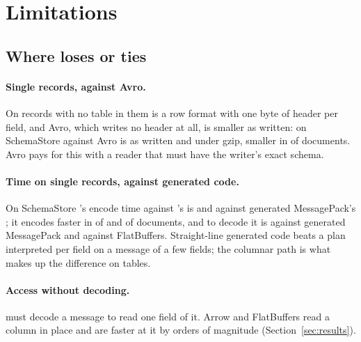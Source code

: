 \FloatBarrier
\section{Limitations}
\label{sec:limitations}

\subsection{Where \colbin{} loses or ties}

\paragraph{Single records, against Avro.} On records with no table in
them \colbin{} is a row format with one byte of header per field, and Avro,
which writes no header at all, is smaller as written: on SchemaStore
\colbin{} against Avro is 
as written and  under
gzip, smaller in
 of
 documents. Avro pays for this
with a reader that must have the writer's exact schema.

\paragraph{Time on single records, against generated code.} On SchemaStore
\colbin{}'s encode time against 's is
 and against
generated MessagePack's
; it encodes
faster in  of
 and
 of
 documents, and to decode it is
 against
generated MessagePack and
 against
FlatBuffers. Straight-line generated code beats a plan interpreted
per field on a message of a few fields; the columnar path is what makes up
the difference on tables.

\paragraph{Access without decoding.} \colbin{} must decode a message to read
one field of it. Arrow and FlatBuffers read a column in place and are faster
at it by orders of magnitude (Section~\ref{sec:results}).


